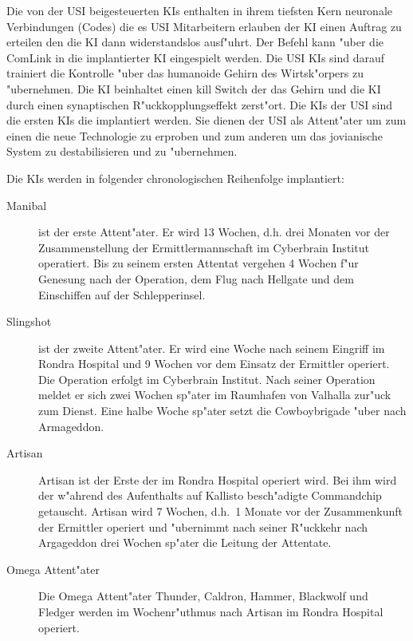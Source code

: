 Die von der USI beigesteuerten KIs enthalten in ihrem tiefsten Kern neuronale Verbindungen (Codes) die es USI Mitarbeitern erlauben der KI einen Auftrag zu erteilen den die KI dann widerstandslos ausf"uhrt. Der Befehl kann "uber die ComLink in die implantierter KI eingespielt werden. Die USI KIs sind darauf trainiert die Kontrolle "uber das humanoide Gehirn des Wirtsk"orpers zu "ubernehmen. Die KI beinhaltet einen kill Switch der das Gehirn und die KI durch einen synaptischen R"uckkopplungseffekt zerst"ort. Die KIs der USI sind die ersten KIs die implantiert werden. Sie dienen der USI als Attent"ater um zum einen die neue Technologie zu erproben und zum anderen um das jovianische System zu destabilisieren und zu "ubernehmen. 

Die KIs werden in folgender chronologischen Reihenfolge implantiert:

\begin{description}
    \item[Manibal] ist der erste Attent"ater. Er wird 13 Wochen, d.h. drei Monaten vor der Zusammenstellung der Ermittlermannschaft im 
        Cyberbrain Institut operatiert. Bis zu seinem ersten Attentat vergehen 4 Wochen f"ur Genesung nach der Operation, dem Flug nach Hellgate und dem Einschiffen auf der Schlepperinsel.
    \item[Slingshot] ist der zweite Attent"ater. Er wird eine Woche nach seinem Eingriff im Rondra Hospital und 9 Wochen vor dem Einsatz 
        der Ermittler operiert. Die Operation erfolgt im Cyberbrain Institut. Nach seiner Operation meldet er sich zwei Wochen sp"ater im Raumhafen von Valhalla zur"uck zum Dienst. Eine halbe Woche sp"ater setzt die Cowboybrigade "uber nach Armageddon.
    \item[Artisan] Artisan ist der Erste der im Rondra Hospital operiert wird. Bei ihm wird der w"ahrend des Aufenthalts auf Kallisto 
        besch"adigte Commandchip getauscht. Artisan wird 7 Wochen, d.h.~1 Monate vor der Zusammenkunft der Ermittler operiert und "ubernimmt nach seiner R"uckkehr nach Argageddon drei Wochen sp"ater die Leitung der Attentate.
    \item[Omega Attent"ater] Die Omega Attent"ater Thunder, Caldron, Hammer, Blackwolf und Fledger werden im Wochenr"uthmus nach Artisan im 
        Rondra Hospital operiert.
\end{description}

